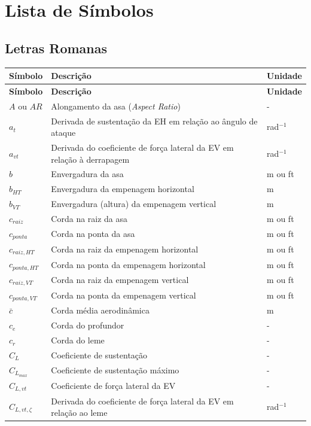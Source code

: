 

\section*{Lista de Símbolos}

\subsection*{Letras Romanas}
\begin{longtable}{p{} p{} p{}}
\textbf{Símbolo} & \textbf{Descrição} & \textbf{Unidade} \\ \hline
\endfirsthead
\textbf{Símbolo} & \textbf{Descrição} & \textbf{Unidade} \\ \hline
\endhead
$A$ ou $AR$ & Alongamento da asa (\textit{Aspect Ratio}) & - \\
$a_t$ & Derivada de sustentação da EH em relação ao ângulo de ataque & rad$^{-1}$ \\
$a_{vt}$ & Derivada do coeficiente de força lateral da EV em relação à derrapagem & rad$^{-1}$ \\
$b$ & Envergadura da asa & m ou ft \\
$b_{HT}$ & Envergadura da empenagem horizontal & m \\
$b_{VT}$ & Envergadura (altura) da empenagem vertical & m \\
$c_{raiz}$ & Corda na raiz da asa & m ou ft \\
$c_{ponta}$ & Corda na ponta da asa & m ou ft \\
$c_{raiz, HT}$ & Corda na raiz da empenagem horizontal & m ou ft \\
$c_{ponta, HT}$ & Corda na ponta da empenagem horizontal & m ou ft \\
$c_{raiz, VT}$ & Corda na raiz da empenagem vertical & m ou ft \\
$c_{ponta, VT}$ & Corda na ponta da empenagem vertical & m ou ft \\
$\bar{c}$ & Corda média aerodinâmica & m \\
$c_e$ & Corda do profundor & - \\
$c_r$ & Corda do leme & - \\
$C_L$ & Coeficiente de sustentação & - \\
$C_{L_{max}}$ & Coeficiente de sustentação máximo & - \\
$C_{L,vt}$ & Coeficiente de força lateral da EV & - \\
$C_{L,vt,\zeta}$ & Derivada do coeficiente de força lateral da EV em relação ao leme & rad$^{-1}$ \\

\end{longtable}
